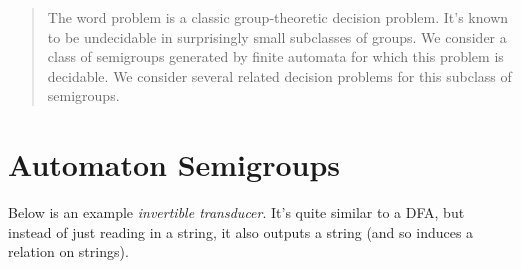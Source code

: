 \documentclass[a0,16pt]{a0poster}
\theoremstyle{pleasant}
\newcommand{\0}{\underline{0}}
\newcommand{\1}{\underline{1}}
\newcommand{\2}{\underline{2}}
\begin{document}
\begin{multicols}{3} %



\begin{abstract}
\large
The word problem is a classic group-theoretic decision problem. It's known to be undecidable in surprisingly small subclasses of groups. We consider a class of semigroups generated by finite automata for which this problem is decidable. We consider several related decision problems for this subclass of semigroups.
\end{abstract}



\section*{Automaton Semigroups}

\Large
Below is an example \textit{invertible transducer}. It's quite similar to a DFA, but instead of just reading in a string, it also outputs a string (and so induces a relation on strings).


\end{multicols}
\end{document}
